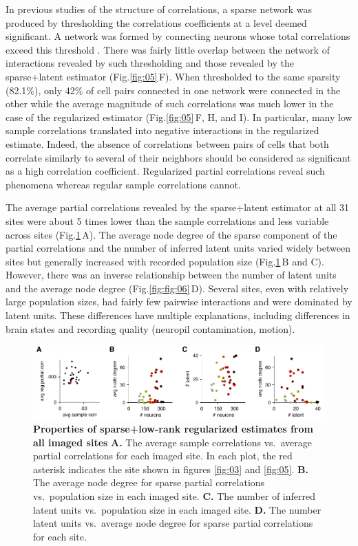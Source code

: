 \documentclass[10pt]{article}
\newcommand{\figref}[2]{Fig.\;\ref{fig:#1}\,#2}
\begin{document}
In previous studies of the structure of correlations, a sparse network was produced by thresholding the correlations coefficients at a level deemed significant. A network was formed by connecting neurons whose total correlations exceed this threshold \cite{Golshani:2009,Malmersjo:2013}. There was fairly little overlap between the network of interactions revealed by such thresholding and those revealed by the sparse+latent estimator (\figref{05}{F}). When thresholded to the same sparsity (82.1\%), only 42\% of cell pairs connected in one network were connected in the other while the average magnitude of such correlations was much lower in the case of the regularized estimator (\figref{05}{F, H, and I}). In particular, many low sample correlations translated into negative interactions in the regularized estimate. Indeed, the absence of correlations between pairs of cells that both correlate similarly to several of their neighbors should be considered as significant as a high correlation coefficient. Regularized partial correlations reveal such phenomena whereas regular sample correlations cannot.

The average partial correlations revealed by the sparse+latent estimator at all 31 sites were about 5 times lower than the sample correlations and  less variable across sites (\figref{06}{A}). The average node degree of the sparse component of the partial correlations and the number of inferred latent units varied widely between sites but generally increased with recorded population size (\figref{06}{B and C}). However, there was an inverse relationship between the number of latent units and the average node degree (\figref{fig:06}{D}). Several sites, even with relatively large population sizes, had fairly few pairwise interactions and were dominated by latent units.  These differences have multiple explanations, including differences in brain states and recording quality (neuropil contamination, motion). 

\begin{figure}[!ht]
    \begin{center}
        \includegraphics{./figures/Figure06.pdf}
    \end{center}
    \caption{{\bf Properties of sparse+low-rank regularized estimates from all imaged sites}
    {\bf A.} The average sample correlations vs.~average partial correlations for each imaged site. In each plot, the red asterisk indicates the site shown in figures \ref{fig:03} and \ref{fig:05}.
    {\bf B.} The average node degree for sparse partial correlations vs.~population size in each imaged site. 
    {\bf C.} The number of inferred latent units vs.~population size in each imaged site.
    {\bf D.} The number latent units vs.~average node degree for sparse partial correlations for each site.
}
\label{fig:06}
\end{figure}
\end{document}
